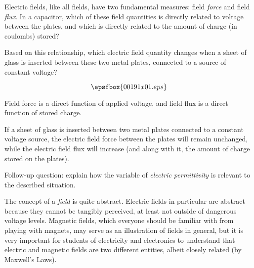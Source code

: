 

Electric fields, like all fields, have two fundamental measures: field {\it force} and field {\it flux}.  In a capacitor, which of these field quantities is directly related to voltage between the plates, and which is directly related to the amount of charge (in coulombs) stored?

Based on this relationship, which electric field quantity changes when a sheet of glass is inserted between these two metal plates, connected to a source of constant voltage?

$$\epsfbox{00191x01.eps}$$







Field force is a direct function of applied voltage, and field flux is a direct function of stored charge. 

If a sheet of glass is inserted between two metal plates connected to a constant voltage source, the electric field force between the plates will remain unchanged, while the electric field flux will increase (and along with it, the amount of charge stored on the plates).

\vskip 10pt

Follow-up question: explain how the variable of {\it electric permittivity} is relevant to the described situation.







The concept of a {\it field} is quite abstract.  Electric fields in particular are abstract because they cannot be tangibly perceived, at least not outside of dangerous voltage levels.  Magnetic fields, which everyone should be familiar with from playing with magnets, may serve as an illustration of fields in general, but it is very important for students of electricity and electronics to understand that electric and magnetic fields are two different entities, albeit closely related (by Maxwell's Laws).




